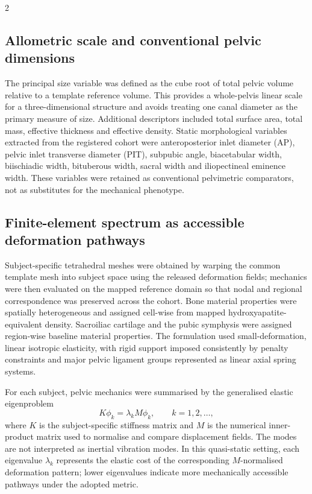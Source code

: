 \documentclass[openacc]{rsproca_new}
\begin{document}
\begin{multicols}{2}
\subsection{Allometric scale and conventional pelvic dimensions}

The principal size variable was defined as the cube root of total pelvic volume relative to a template reference volume. This provides a whole-pelvis linear scale for a three-dimensional structure and avoids treating one canal diameter as the primary measure of size. Additional descriptors included total surface area, total mass, effective thickness and effective density. Static morphological variables extracted from the registered cohort were anteroposterior inlet diameter (AP), pelvic inlet transverse diameter (PIT), subpubic angle, biacetabular width, biischiadic width, bituberous width, sacral width and iliopectineal eminence width. These variables were retained as conventional pelvimetric comparators, not as substitutes for the mechanical phenotype.

\subsection{Finite-element spectrum as accessible deformation pathways}

Subject-specific tetrahedral meshes were obtained by warping the common template mesh into subject space using the released deformation fields; mechanics were then evaluated on the mapped reference domain so that nodal and regional correspondence was preserved across the cohort. Bone material properties were spatially heterogeneous and assigned cell-wise from mapped hydroxyapatite-equivalent density. Sacroiliac cartilage and the pubic symphysis were assigned region-wise baseline material properties. The formulation used small-deformation, linear isotropic elasticity, with rigid support imposed consistently by penalty constraints and major pelvic ligament groups represented as linear axial spring systems.

For each subject, pelvic mechanics were summarised by the generalised elastic eigenproblem
\begin{equation}
K\phi_{k} = \lambda_{k} M\phi_{k}, \qquad k=1,2,\ldots,
\end{equation}
where $K$ is the subject-specific stiffness matrix and $M$ is the numerical inner-product matrix used to normalise and compare displacement fields. The modes are not interpreted as inertial vibration modes. In this quasi-static setting, each eigenvalue $\lambda_k$ represents the elastic cost of the corresponding $M$-normalised deformation pattern; lower eigenvalues indicate more mechanically accessible pathways under the adopted metric.


\end{multicols}
\end{document}
